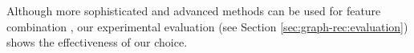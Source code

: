 Although more sophisticated and advanced methods can be used for feature combination \cite{Beliakov2015}, our experimental evaluation (see Section \ref{sec:graph-rec:evaluation}) shows the effectiveness of our choice.   
%




